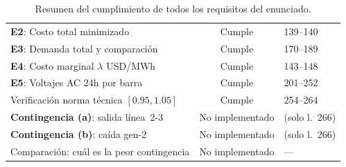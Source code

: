 \documentclass[12pt, a4paper]{article}
\begin{document}
\begin{table}[h!]
\begin{tabular}{p{} c p{}}
\textbf{E2}: Costo total minimizado & \textcolor{okgreen}{Cumple} & 139--140 \\
\textbf{E3}: Demanda total y comparación & \textcolor{okgreen}{Cumple} & 170--189 \\
\textbf{E4}: Costo marginal $\lambda$ USD/MWh & \textcolor{okgreen}{Cumple} & 143--148 \\
\textbf{E5}: Voltajes AC 24h por barra & \textcolor{okgreen}{Cumple} & 201--252 \\
Verificación norma técnica $[0.95, 1.05]$ & \textcolor{okgreen}{Cumple} & 254--264 \\
\textbf{Contingencia (a)}: salida línea~2-3 & \textcolor{warnred}{No implementado} & (solo l.~266) \\
\textbf{Contingencia (b)}: caída gen-2 & \textcolor{warnred}{No implementado} & (solo l.~266) \\
Comparación: cuál es la peor contingencia & \textcolor{warnred}{No implementado} & --- \\
\bottomrule
\end{tabular}
\caption{Resumen del cumplimiento de todos los requisitos del enunciado.}
\end{table}
\end{document}
